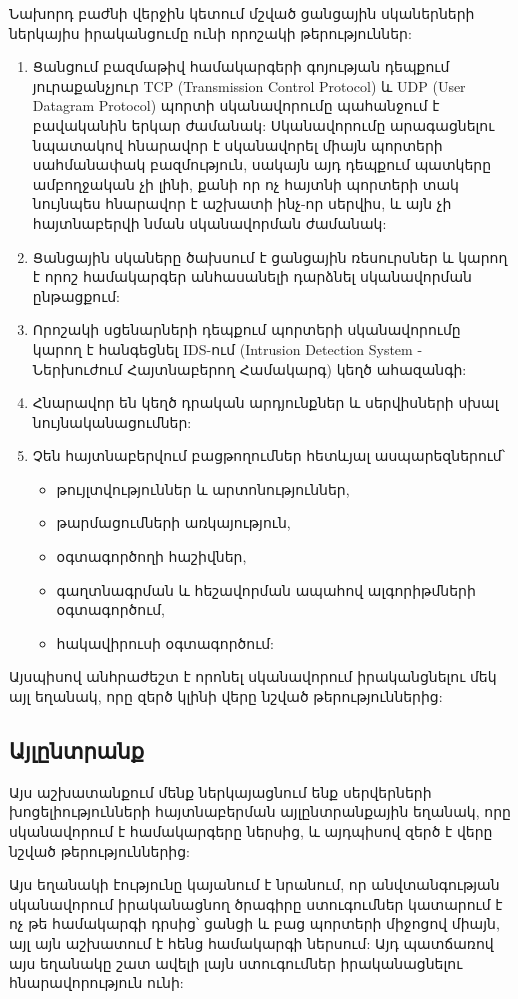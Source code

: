 \documentclass[a4paper,12pt]{article}
\begin{document}
\begin{sloppypar}
Նախորդ բաժնի վերջին կետում մշված ցանցային սկաներների ներկայիս իրականցումը
ունի որոշակի թերություններ:

\begin{enumerate}
\item Ցանցում բազմաթիվ համակարգերի գոյության դեպքում յուրաքանչյուր TCP
	(Transmission Control Protocol) և UDP (User Datagram Protocol)
	պորտի սկանավորումը պահանջում է բավականին երկար ժամանակ:
	Սկանավորումը արագացնելու նպատակով հնարավոր է սկանավորել միայն
	պորտերի սահմանափակ բազմություն, սակայն այդ դեպքում պատկերը ամբողջական
	չի լինի, քանի որ ոչ հայտնի պորտերի տակ նույնպես հնարավոր է աշխատի
	ինչ-որ սերվիս, և այն չի հայտնաբերվի նման սկանավորման ժամանակ:
\item Ցանցային սկաները ծախսում է ցանցային ռեսուրսներ և կարող է որոշ համակարգեր
    անհասանելի դարձնել սկանավորման ընթացքում:
\item Որոշակի սցենարների դեպքում պորտերի սկանավորումը կարող է
    հանգեցնել IDS-ում (Intrusion Detection System - Ներխուժում Հայտնաբերող Համակարգ)
	կեղծ ահազանգի:
\item Հնարավոր են կեղծ դրական արդյունքներ և սերվիսների սխալ
	նույնականացումներ:
\item Չեն հայտնաբերվում բացթողումներ հետևյալ ասպարեզներում՝
	\begin{itemize}
	\item թույլտվություններ և արտոնություններ,
	\item թարմացումների առկայություն,
	\item օգտագործողի հաշիվներ,
	\item գաղտնագրման և հեշավորման ապահով ալգորիթմների օգտագործում,
	\item հակավիրուսի օգտագործում:
	\end{itemize}
\end{enumerate}

Այսպիսով անհրաժեշտ է որոնել սկանավորում իրականցնելու մեկ այլ եղանակ,
որը զերծ կլինի վերը նշված թերություններից:


\subsection{Այլընտրանք}


Այս աշխատանքում մենք ներկայացնում ենք սերվերների խոցելիությունների
հայտնաբերման այլընտրանքային եղանակ, որը սկանավորում է համակարգերը
ներսից, և այդպիսով զերծ է վերը նշված թերություններից:

Այս եղանակի էությունը կայանում է նրանում, որ անվտանգության սկանավորում
իրականացնող ծրագիրը ստուգումներ կատարում է ոչ թե համակարգի դրսից՝
ցանցի և բաց պորտերի միջոցով միայն, այլ այն աշխատում է հենց համակարգի ներսում:
Այդ պատճառով այս եղանակը շատ ավելի լայն ստուգումներ իրականացնելու
հնարավորություն ունի:


\end{sloppypar}
\end{document}
